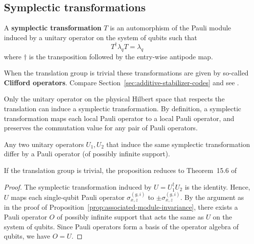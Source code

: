 \subsection{Symplectic transformations}
\label{sec:symplectic-transformations}

\begin{defn}
A {\bf symplectic transformation} $T$ is an automorphism of the Pauli module
induced by a unitary operator on the system of qubits
such that 
\[
  T^\dagger \lambda_q T = \lambda_q
\]
where $\dagger$ is the transposition followed by the entry-wise antipode map.
\label{defn:symplectic-transformation}
\end{defn}
When the translation group is trivial these transformations are given by so-called {\bf Clifford operators}.
Compare Section~\ref{sec:additive-stabilizer-codes} and
see \cite[Chapter 15]{KitaevShenVyalyi2002CQC}.

Only the unitary operator on the physical Hilbert space 
that respects the translation can induce a symplectic transformation.
By definition, a symplectic transformation maps each local Pauli operator to a local Pauli operator, and 
preserves the commutation value for any pair of Pauli operators.
\begin{prop}
Any two unitary operators $U_1, U_2$ that induce the same symplectic transformation
differ by a Pauli operator (of possibly infinite support).
\end{prop}
If the translation group is trivial,
the proposition reduces to Theorem~15.6 of \cite{KitaevShenVyalyi2002CQC}
\begin{proof}
The symplectic transformation induced by $U = U_1^\dagger U_2$ is the identity.
Hence, $U$ maps each single-qubit Pauli operator $\sigma_{x,z}^{(g,i)}$ to $\pm \sigma_{x,z}^{(g,i)}$.
By the argument as in the proof of Proposition~\ref{prop:associated-module-invariance},
there exists a Pauli operator $O$ of possibly infinite support
that acts the same as $U$ on the system of qubits.
Since Pauli operators form a basis of the operator algebra of qubits,
we have $O=U$.
\end{proof}



